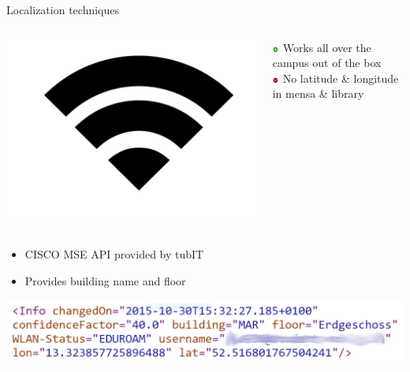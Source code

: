 \documentclass[11pt]{beamer}
\begin{document}
\begin{frame}{Localization techniques}

  \begin{columns}

    \begin{column}{0.2\textwidth}
      \includegraphics[width=\textwidth]{wifi-symbol}
    \end{column}

    \hfill

    \begin{column}{0.8\textwidth}

      \includegraphics[width=0.05\textwidth]{plus} Works all over the campus out of the box\\
      \includegraphics[width=0.05\textwidth]{minus} No latitude \& longitude in mensa \& library

    \end{column}

  \end{columns}

  \vspace{0.5cm}

  \begin{itemize}
    \setlength{\itemsep}{1.5ex}
    \item CISCO MSE API provided by tubIT
    \item Provides building name and floor
  \end{itemize}

  \vspace{0.25cm}

  \begin{center}
    \includegraphics[width=\textwidth]{tubitapi_response}
  \end{center}

\end{frame}
\end{document}
